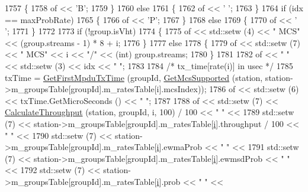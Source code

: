 \begin{DoxyCode}
1757             \{
1758               of << \textcolor{charliteral}{'B'};
1759             \}
1760           \textcolor{keywordflow}{else}
1761             \{
1762               of << \textcolor{charliteral}{' '};
1763             \}
1764           \textcolor{keywordflow}{if} (idx == maxProbRate)
1765             \{
1766               of << \textcolor{charliteral}{'P'};
1767             \}
1768           \textcolor{keywordflow}{else}
1769             \{
1770               of << \textcolor{charliteral}{' '};
1771             \}
1772 
1773           \textcolor{keywordflow}{if} (!group.isVht)
1774             \{
1775               of << std::setw (4) << \textcolor{stringliteral}{"   MCS"} << (group.streams - 1) * 8 + i;
1776             \}
1777           \textcolor{keywordflow}{else}
1778             \{
1779               of << std::setw (7) << \textcolor{stringliteral}{"   MCS"} << i << \textcolor{stringliteral}{"/"} << (int) group.streams;
1780             \}
1781 
1782           of << \textcolor{stringliteral}{"  "} << std::setw (3) << idx << \textcolor{stringliteral}{"  "};
1783 
1784           \textcolor{comment}{/* tx\_time[rate(i)] in usec */}
1785           txTime = \hyperlink{classns3_1_1MinstrelHtWifiManager_a53308ad39a550d0972aad572b3566ec5}{GetFirstMpduTxTime} (groupId, 
      \hyperlink{classns3_1_1WifiRemoteStationManager_af21ecff608cea2837c1af9385bbe6e4e}{GetMcsSupported} (station, station->m\_groupsTable[groupId].m\_ratesTable[i].mcsIndex));
1786           of << std::setw (6) << txTime.GetMicroSeconds () << \textcolor{stringliteral}{"  "};
1787 
1788           of << std::setw (7) << \hyperlink{classns3_1_1MinstrelHtWifiManager_aedf901def4f23eac093a7da8f363170b}{CalculateThroughput} (station, groupId, i, 100) / 100 <<
       \textcolor{stringliteral}{"   "} <<
1789             std::setw (7) << station->m\_groupsTable[groupId].m\_ratesTable[\hyperlink{bernuolliDistribution_8m_a6f6ccfcf58b31cb6412107d9d5281426}{i}].throughput / 100 << \textcolor{stringliteral}{"   "} <<
1790             std::setw (7) << station->m\_groupsTable[groupId].m\_ratesTable[\hyperlink{bernuolliDistribution_8m_a6f6ccfcf58b31cb6412107d9d5281426}{i}].ewmaProb << \textcolor{stringliteral}{"  "} <<
1791             std::setw (7) << station->m\_groupsTable[groupId].m\_ratesTable[\hyperlink{bernuolliDistribution_8m_a6f6ccfcf58b31cb6412107d9d5281426}{i}].ewmsdProb << \textcolor{stringliteral}{"  "} <<
1792             std::setw (7) << station->m\_groupsTable[groupId].m\_ratesTable[\hyperlink{bernuolliDistribution_8m_a6f6ccfcf58b31cb6412107d9d5281426}{i}].prob << \textcolor{stringliteral}{"  "} <<

\end{DoxyCode}
